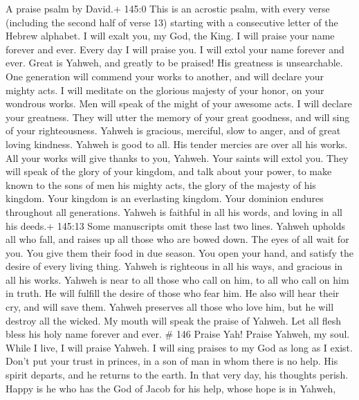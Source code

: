 A praise psalm by David.+ 145:0 This is an acrostic psalm, with every
verse (including the second half of verse 13) starting with a
consecutive letter of the Hebrew alphabet.  I will exalt
you, my God, the King. I will praise your name forever and ever.
 Every day I will praise you. I will extol your name forever
and ever.  Great is Yahweh, and greatly to be praised! His
greatness is unsearchable.  One generation will commend your
works to another, and will declare your mighty acts.  I will
meditate on the glorious majesty of your honor, on your wondrous works.
 Men will speak of the might of your awesome acts. I will
declare your greatness.  They will utter the memory of your
great goodness, and will sing of your righteousness.  Yahweh
is gracious, merciful, slow to anger, and of great loving kindness.
 Yahweh is good to all. His tender mercies are over all his
works.  All your works will give thanks to you, Yahweh.
Your saints will extol you.  They will speak of the glory
of your kingdom, and talk about your power,  to make known
to the sons of men his mighty acts, the glory of the majesty of his
kingdom.  Your kingdom is an everlasting kingdom. Your
dominion endures throughout all generations. Yahweh is faithful in all
his words, and loving in all his deeds.+ 145:13 Some manuscripts omit
these last two lines.  Yahweh upholds all who fall, and
raises up all those who are bowed down.  The eyes of all
wait for you. You give them their food in due season.  You
open your hand, and satisfy the desire of every living thing.
 Yahweh is righteous in all his ways, and gracious in all
his works.  Yahweh is near to all those who call on him, to
all who call on him in truth.  He will fulfill the desire
of those who fear him. He also will hear their cry, and will save them.
 Yahweh preserves all those who love him, but he will
destroy all the wicked.  My mouth will speak the praise of
Yahweh. Let all flesh bless his holy name forever and ever. \# 146
 Praise Yah! Praise Yahweh, my soul.  While I
live, I will praise Yahweh. I will sing praises to my God as long as I
exist.  Don't put your trust in princes, in a son of man in
whom there is no help.  His spirit departs, and he returns
to the earth. In that very day, his thoughts perish.  Happy
is he who has the God of Jacob for his help, whose hope is in Yahweh,
